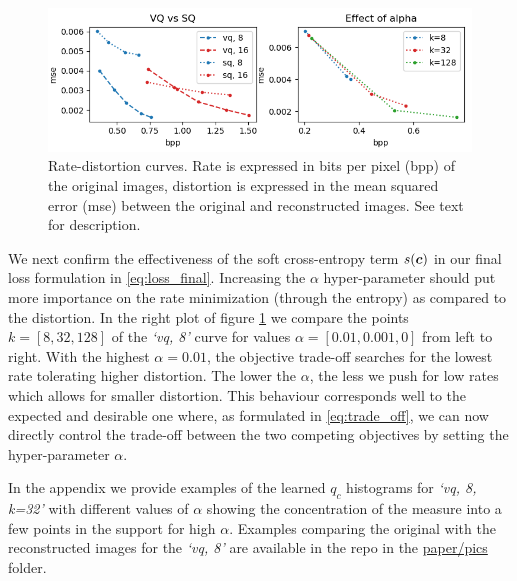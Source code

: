 \documentclass{article} %
\newcommand{\qc}{q_c}
\begin{document}
\begin{figure}[h]
\begin{center}
\includegraphics[scale=0.6]{figure1.png}
\end{center}
\caption{Rate-distortion curves. Rate is expressed in bits per pixel (bpp) of the original images, distortion is expressed in the mean squared error (mse) between the original and reconstructed images. See text for description.}\label{fig:plots}
\end{figure}

We next confirm the effectiveness of the soft cross-entropy term $s({\bm{c}})$ in our final loss formulation in \eqref{eq:loss_final}.
Increasing the $\alpha$ hyper-parameter should put more importance on the rate minimization (through the entropy) as compared to the distortion.
In the right plot of figure \ref{fig:plots} we compare the points $k=[8, 32, 128]$ of the \emph{`vq, 8'} curve for values $\alpha = [0.01, 0.001, 0]$ from left to right.
With the highest $\alpha = 0.01$, the objective trade-off searches for the lowest rate tolerating higher distortion. The lower the $\alpha$, the less we push for low rates which allows for smaller distortion. 
This behaviour corresponds well to the expected and desirable one where, as formulated in \eqref{eq:trade_off}, we can now directly control the trade-off between the two competing objectives by setting the hyper-parameter $\alpha$.

In the appendix we provide examples of the learned $\qc$ histograms for \emph{`vq, 8, k=32'} with different values of $\alpha$ showing the concentration of the measure into a few points in the support for high $\alpha$.
Examples comparing the original with the reconstructed images for the \emph{`vq, 8'} are available in %
the repo in the \href{https://bitbucket.org/dmmlgeneva/softvqae/src/master/paper/pics}{paper/pics} folder.


\end{document}
